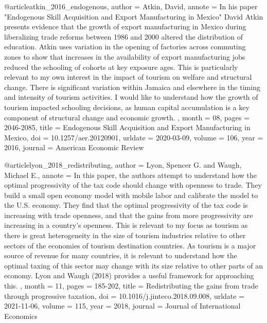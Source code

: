 @article{atkin_2016_endogenous,
	author = {Atkin, David},
	annote = {In his paper "Endogenous Skill Acquisition and Export Manufacturing in Mexico" David Atkin presents evidence that the growth of export manufacturing in Mexico during liberalizing trade reforms between 1986 and 2000 altered the distribution of education. Atkin uses variation in the opening of factories across commuting zones to show that increases in the availability of export manufacturing jobs reduced the schooling of cohorts at key exposure ages. This is particularly relevant to my own interest in the impact of tourism on welfare and structural change. There is significant variation within Jamaica and elsewhere in the timing and intensity of tourism activities. I would like to understand how the growth of tourism impacted schooling decisions, as human capital accumulation is a key component of structural change and economic growth. },
	month = {08},
	pages = {2046-2085},
	title = {Endogenous Skill Acquisition and Export Manufacturing in Mexico},
	doi = {10.1257/aer.20120901},
	urldate = {2020-03-09},
	volume = {106},
	year = {2016},
	journal = {American Economic Review}
}

@article{lyon_2018_redistributing,
	author = {Lyon, Spencer G. and Waugh, Michael E.},
	annote = {In this paper, the authors attempt to understand how the optimal progressivity of the tax code should change with openness to trade. They build a small open economy model with mobile labor and calibrate the model to the U.S. economy. They find that the optimal progressivity of the tax code is increasing with trade openness, and that the gains from more progressivity are increasing in a country's openness. This is relevant to my focus as tourism as there is great heterogeneity in the size of tourism industries relative to other sectors of the economies of tourism destination countries. As tourism is a major source of revenue for many countries, it is relevant to understand how the optimal taxing of this sector may change with its size relative to other parts of an economy. Lyon and Waugh (2018) provides a useful framework for approaching this. },
	month = {11},
	pages = {185-202},
	title = {Redistributing the gains from trade through progressive taxation},
	doi = {10.1016/j.jinteco.2018.09.008},
	urldate = {2021-11-06},
	volume = {115},
	year = {2018},
	journal = {Journal of International Economics}
}

